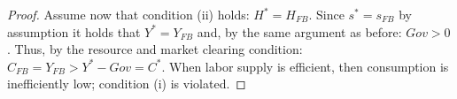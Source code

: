 \begin{proof}
	Assume now that condition (ii) holds: $H^*=H_{FB}$. Since $s^*=s_{FB}$ by assumption it holds that $Y^*=Y_{FB}$ and, by the same argument as before: $Gov>0$. Thus, by the resource and market clearing condition: $C_{FB}=Y_{FB}>Y^*-Gov=C^*$. When labor supply is efficient, then consumption is inefficiently low; condition (i) is violated. 
	

\end{proof}

